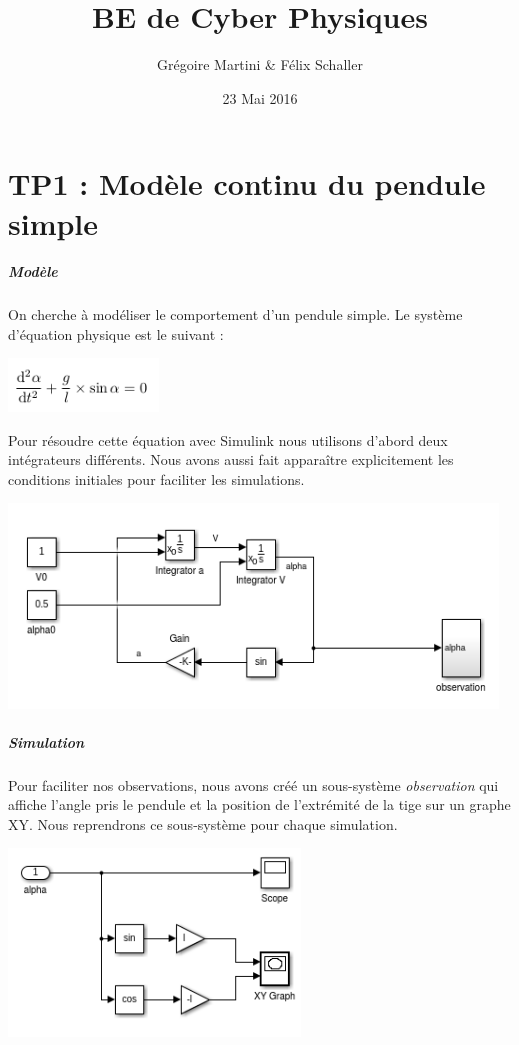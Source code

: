 \documentclass[a4paper,12pt]{article}
\title{BE de Cyber Physiques}
\author{Grégoire Martini \& Félix Schaller }
\date{23 Mai 2016}
\begin{document}
\maketitle

\bigskip
\bigskip
\bigskip
\tableofcontents
\newpage


\section{TP1 : Modèle continu du pendule simple}
\subparagraph{Modèle}

On cherche à modéliser le comportement d'un pendule simple. Le système d'équation physique est le suivant :

\begin{center}
\includegraphics[width=4cm]{./img/tp1_eq.png}
\end{center}


Pour résoudre cette équation avec Simulink nous utilisons d'abord deux intégrateurs différents. Nous avons aussi fait apparaître explicitement les conditions initiales pour faciliter les simulations.

\begin{center}
\includegraphics[width=13cm]{./img/tp1.png}
\end{center}

\subparagraph{Simulation}

Pour faciliter nos observations, nous avons créé un sous-système \textit{observation} qui affiche l'angle pris le pendule et la position de l'extrémité de la tige sur un graphe XY. Nous reprendrons ce sous-système pour chaque simulation.

\begin{center}
\includegraphics[height=5cm]{./img/obs.png}
\end{center}
\end{document}
